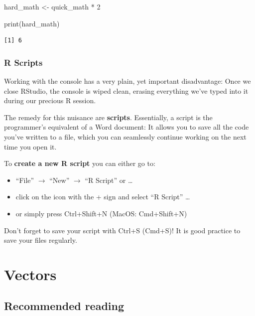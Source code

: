 \documentclass[
  11pt,
  letterpaper,
  DIV=11,
  numbers=noendperiod]{scrreprt}
\newenvironment{Shaded}{\begin{snugshade}}{\end{snugshade}}
\newcommand{\DecValTok}[1]{\textcolor[rgb]{0.68,0.00,0.00}{#1}}
\newcommand{\FunctionTok}[1]{\textcolor[rgb]{0.28,0.35,0.67}{#1}}
\newcommand{\NormalTok}[1]{\textcolor[rgb]{0.00,0.23,0.31}{#1}}
\newcommand{\OtherTok}[1]{\textcolor[rgb]{0.00,0.23,0.31}{#1}}
\newcommand{\SpecialCharTok}[1]{\textcolor[rgb]{0.37,0.37,0.37}{#1}}
\begin{document}
\begin{Shaded}
\begin{Highlighting}[]
\NormalTok{hard\_math }\OtherTok{\textless{}{-}}\NormalTok{ quick\_math }\SpecialCharTok{*} \DecValTok{2}

\FunctionTok{print}\NormalTok{(hard\_math)}
\end{Highlighting}
\end{Shaded}

\begin{verbatim}
[1] 6
\end{verbatim}

\subsection{R Scripts}\label{r-scripts}

Working with the console has a very plain, yet important disadvantage:
Once we close RStudio, the console is wiped clean, erasing everything
we've typed into it during our precious R session.

The remedy for this nuisance are \textbf{scripts}. Essentially, a script
is the programmer's equivalent of a Word document: It allows you to save
all the code you've written to a file, which you can seamlessly continue
working on the next time you open it.

To \textbf{create a new R script} you can either go to:

\begin{itemize}
\item
  ``File'' \(\rightarrow\) ``New'' \(\rightarrow\) ``R Script'' or
  \ldots{}
\item
  click on the icon with the + sign and select ``R Script'' \ldots{}
\item
  or simply press Ctrl+Shift+N (MacOS: Cmd+Shift+N)
\end{itemize}

Don't forget to save your script with Ctrl+S (Cmd+S)! It is good
practice to save your files regularly.

\chapter{Vectors}\label{vectors}

\section{Recommended reading}\label{recommended-reading}
\end{document}
